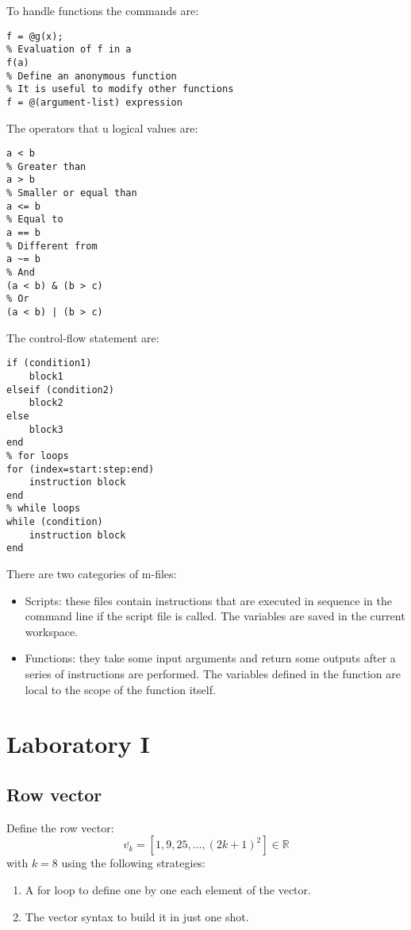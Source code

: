 \documentclass[12pt, a4paper]{report}
\begin{document}
    To handle functions the commands are: 
    \begin{lstlisting}[style=Matlab]
% Define a function handle to g(x)
f = @g(x);
% Evaluation of f in a
f(a) 
% Define an anonymous function
% It is useful to modify other functions
f = @(argument-list) expression
    \end{lstlisting} 
    The operators that u logical values are:  
    \begin{lstlisting}[style=Matlab]
% Smaller than
a < b     
% Greater than
a > b
% Smaller or equal than
a <= b   
% Equal to
a == b    
% Different from
a ~= b  
% And
(a < b) & (b > c)  
% Or   
(a < b) | (b > c)     
    \end{lstlisting} 
    The control-flow statement are: 
    \begin{lstlisting}[style=Matlab]
% if-then-else statements
if (condition1)
    block1
elseif (condition2)
    block2
else
    block3
end
% for loops
for (index=start:step:end)
    instruction block
end
% while loops
while (condition)
    instruction block
end
    \end{lstlisting}    
    There are two categories of m-files: 
    \begin{itemize}
        \item Scripts: these files contain instructions that are executed in sequence in the command line if the script file is called. 
            The variables are saved in the current workspace.
        \item Functions: they take some input arguments and return some outputs after a series of instructions are performed. 
            The variables defined in the function are local to the scope of the function itself.
    \end{itemize}

\newpage

\chapter{Laboratory I}
    \section{Row vector}
        Define the row vector: 
        \[ \bar{v_k} = [1,9,25,\dots,\left( 2k+1 \right)^2] \in \mathbb{R} \]
        with $k=8$ using the following strategies:
        \begin{enumerate}
            \item A for loop to define one by one each element of the vector.
            \item The vector syntax to build it in just one shot.
        \end{enumerate}
\end{document}
